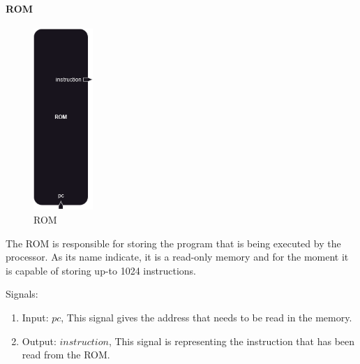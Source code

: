 \paragraph{ROM}

\begin{figure}[H]
    \centering
    \includegraphics[width=0.20\textwidth]{design/pipelined/rom_ram_reg/images/rom.png}
    \caption{ROM}
    \label{fig:rom}
\end{figure}

The ROM is responsible for storing the program that is being executed by the processor. As its name indicate, it is 
a read-only memory and for the moment it is capable of storing up-to 1024 instructions.

Signals:
\begin{enumerate}[label={\textbullet}]
    \item Input: $pc$, This signal gives the address that needs to be read in the memory.
    \item Output: $instruction$, This signal is representing the instruction that has been read from the ROM.
\end{enumerate}